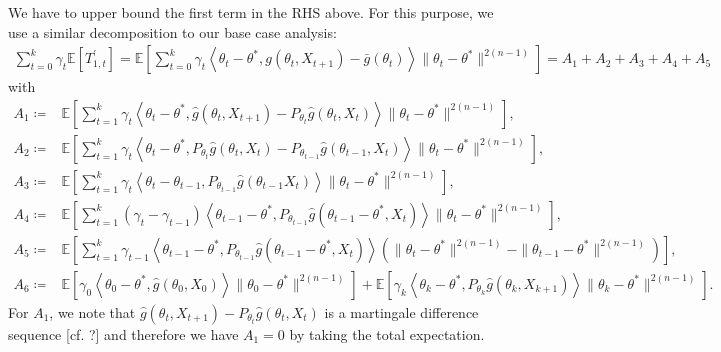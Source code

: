 \documentclass[a4paper]{article}
\newcommand{\norm}[1]{\|#1 \|}
\newcommand{\Exs}{\mathbb{E}}
\newcommand{\thetastar}{\theta^*}
\newcommand{\constTprime}[1]{T_{#1}^{\prime}}
\begin{document}
	We have to upper bound the first term in the RHS above. For this purpose, we use a similar decomposition to our base case analysis:
	\begin{align*}
		\sum_{t = 0}^{k}\gamma_{t}\Exs\left[\constTprime{1, t}\right] = \Exs\left[\sum_{t = 0}^{k}\gamma_{t}\left\langle \theta_{t} - \thetastar, g\left(\theta_{t}, X_{t + 1}\right) - \bar{g}\left(\theta_{t}\right)\right\rangle\norm{\theta_{t} - \thetastar}^{2(n - 1)}\right] = A_{1} + A_{2} + A_{3} + A_{4} + A_{5}
	\end{align*} 
	with
	\begin{align*}
		A_{1} \coloneq & \Exs\left[\sum_{t = 1}^{k}\gamma_{t}\left\langle \theta_{t} - \thetastar, \hat{g}\left(\theta_{t}, X_{t + 1}\right) - P_{\theta_{t}}\hat{g}\left(\theta_{t}, X_{t}\right) \right\rangle\norm{\theta_{t} - \thetastar}^{2(n - 1)}\right],\\
		A_{2} \coloneq & \Exs\left[\sum_{t = 1}^{k}\gamma_{t}\left\langle \theta_{t} - \thetastar, P_{\theta_{t}}\hat{g}\left(\theta_{t}, X_{t}\right) - P_{\theta_{t - 1}}\hat{g}\left( \theta_{t - 1}, X_{t} \right) \right\rangle\norm{\theta_{t} - \thetastar}^{2(n - 1)}\right],\\
		A_{3} \coloneq & \Exs\left[\sum_{t = 1}^{k}\gamma_{t}\left\langle \theta_{t} - \theta_{t - 1}, P_{\theta_{t - 1}}\hat{g}\left( \theta_{t - 1} X_{t}\right) \right\rangle \norm{\theta_{t} - \thetastar}^{2(n - 1)}\right],\\
		A_{4} \coloneq & \Exs\left[\sum_{t = 1}^{k}\left(\gamma_{t} - \gamma_{t - 1}\right)\left\langle \theta_{t - 1} - \thetastar, P_{\theta_{t - 1}}\hat{g}\left( \theta_{t - 1} - \thetastar, X_{t}\right) \right\rangle\norm{\theta_{t} - \thetastar}^{2(n - 1)}\right],\\
		A_{5} \coloneq & \Exs\left[\sum_{t = 1}^{k}\gamma_{t - 1}\left\langle \theta_{t - 1} - \thetastar, P_{\theta_{t - 1}}\hat{g}\left(\theta_{t - 1} - \thetastar, X_{t}\right)\right\rangle\left(\norm{\theta_{t} - \thetastar}^{2(n - 1)} - \norm{\theta_{t - 1} - \thetastar}^{2(n - 1)}\right)\right],\\
		A_{6} \coloneq & \Exs\left[\gamma_{0}\left\langle \theta_{0} - \thetastar, \hat{g}\left(\theta_{0}, X_{0}\right) \right\rangle\norm{\theta_{0} - \thetastar}^{2(n - 1)}\right] + \Exs\left[\gamma_{k}\left\langle \theta_{k} - \thetastar, P_{\theta_{k}}\hat{g}\left(\theta_{k}, X_{k + 1}\right)\right\rangle\norm{\theta_{k} - \thetastar}^{2(n - 1)}\right].
	\end{align*}
	For $A_{1}$, we note that $\hat{g}\left(\theta_{t}, X_{t + 1}\right) - P_{\theta_{t}} \hat{g}\left(\theta_{t}, X_{t}\right)$ is a martingale difference sequence [cf. ?] and therefore we have $A_{1} = 0$ by taking the total expectation.
	
\end{document}
